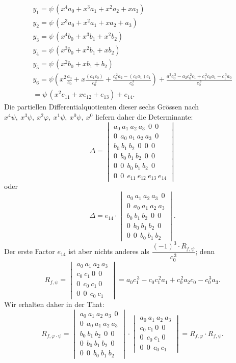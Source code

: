 \begin{gather*}
y_1 = \psi\,(x^4a_0+x^3a_1+x^2a_2+xa_3)\\
y_2 = \psi\,(x^3a_0+x^2a_1+xa_2+a_3)\\
y_3 = \psi\,(x^4b_0+x^3b_1+x^2b_2)\\
y_4 = \psi\,(x^3b_0+x^2b_1+xb_2)\\
y_5 = \psi\,(x^2b_0+xb_1+b_2)\\
y_6 = \psi\left(x^2\frac{a_0}{c_0}+x\frac{(a_1c_0)}{c_0^{\,2}}+\frac{c_0^{\,2}a_2-(c_0a_1)c_1}{c_0^{\,3}}\right)+\frac{a^3c_0^{\,3}-a_2c_0^{\,2}c_1+c_1^{\,2}c_0a_1-c_1^{\,3}a_0}{c_0^{\,3}} %
\\
= \psi\,(x^2e_{11}+xe_{12}+e_{13})+e_{14}.
\end{gather*}
Die partiellen Differentialquotienten dieser sechs Gr\"ossen nach $x^4\psi,\ x^3\psi,\ x^2\varphi,\ x^1\psi,\ x^0\psi,\ x^0$ liefern daher die Determinante:
\[
\varDelta =
\begin{vmatrix}
a_0\ a_1\ a_2\ a_3\ \ 0\ \ 0\\
0\ \ a_0\ a_1\ a_2\ a_3\ \ 0\\
b_0\ b_1\ b_2\ \ 0\ \ 0\ \ 0\\
0\ \ b_0\ b_1\ b_2\ \ 0\ \ 0\\
0\ \ 0\ \ b_0\ b_1\ b_2\ \ 0\\
0\ \ 0\ \ e_{11}\ e_{12}\ e_{13}\ e_{14}
\end{vmatrix}
\]
oder
\[
\varDelta = e_{14}\cdot
\begin{vmatrix}
a_0\ a_1\ a_2\ a_3\ \ 0\\
0\ \ a_0\ a_1\ a_2\ a_3\\
b_0\ b_1\ b_2\ \ 0\ \ 0\\
0\ \ b_0\ b_1\ b_2\ \ 0\\
0\ \ 0\ \ b_0\ b_1\ b_2
\end{vmatrix}.
\]
Der erste Factor $e_{14}$ ist aber nichts anderes als $\dfrac{(-1)^3\cdot R_{f,\psi}}{c_0^{\,3}}$; denn
\[
R_{f,\psi} =
\begin{vmatrix}
a_0\ a_1\ a_2\ a_3\\
c_0\ c_1\ 0\ \ 0\\
0\ \ c_0\ c_1\ 0\\
0\ \ 0\ \ c_0\ c_1
\end{vmatrix}
= a_0c_1^{\,3} - c_0c_1^{\,2}a_1 + c_0^{\,2}a_2c_0 - c_0^{\,3}a_3. %
\]
Wir erhalten daher in der That:
\[
R_{f,\varphi\cdot\psi} =
\begin{vmatrix}
a_0\ a_1\ a_2\ a_3\ \ 0\\
0\ \ a_0\ a_1\ a_2\ a_3\\
b_0\ b_1\ b_2\ \ 0\ \ 0\\
0\ \ b_0\ b_1\ b_2\ \ 0\\
0\ \ 0\ \ b_0\ b_1\ b_2
\end{vmatrix}
\cdot
\begin{vmatrix}
a_0\ a_1\ a_2\ a_3\\
c_0\ c_1\ 0\ \ 0\\
0\ \ c_0\ c_1\ 0\\
0\ \ 0\ \ c_0\ c_1
\end{vmatrix}
= R_{f,\varphi}\cdot R_{f,\psi}.
\]


